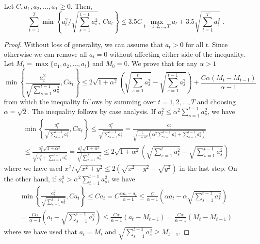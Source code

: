 \begin{lemma}
\label{lemma:useful}
Let $C, a_1, a_2, \dots, a_T\geq0$. Then,
$$
\sum_{t=1}^T \min \left\{ a_t^2 / \sqrt{\sum_{s=1}^{t-1} a_s^2}, \ C a_t \right\}
\le 3.5 C \max_{t=1,2,\dots,T} a_t + 3.5 \sqrt{\sum_{t=1}^T a_t^2} \; .
$$
\end{lemma}
\begin{proof}
Without loss of generality, we can assume that $a_t > 0$ for all $t$. Since otherwise we
can remove all $a_t = 0$ without affecting either side of the inequality. Let $M_t = \max\{a_1, a_2, \dots, a_t\}$ and $M_0 = 0$.
We prove that for any $\alpha > 1$
$$
\min\left\{ \frac{a_t^2}{\sqrt{\sum_{s=1}^{t-1} a_s^2}}, C a_t \right\}
\le 2 \sqrt{1+\alpha^2} \left( \sqrt{\sum_{s=1}^t a_s^2} - \sqrt{\sum_{s=1}^{t-1} a_s^2} \right) + \frac{C\alpha( M_t  - M_{t-1})}{\alpha - 1}
$$
from which the inequality follows by summing over $t=1,2,\dots,T$ and choosing $\alpha = \sqrt{2}$.
The inequality follows by case analysis. If $a_t^2 \le \alpha^2 \sum_{s=1}^{t-1} a_s^2$, we have
\begin{multline*}
\min\left\{ \frac{a_t^2}{\sqrt{\sum_{s=1}^{t-1} a_s^2}}, C a_t \right\}
\le \frac{a_t^2}{\sqrt{\sum_{s=1}^{t-1} a_s^2}}
= \frac{a_t^2}{\sqrt{\frac{1}{1+\alpha^2} \left( \alpha^2 \sum_{s=1}^{t-1} a_s^2 + \sum_{s=1}^{t-1} a_s^2 \right)}} \\
\le \frac{a_t^2\sqrt{1+\alpha^2}}{\sqrt{ a_t^2 + \sum_{s=1}^{t-1} a_s^2 }}
= \frac{a_t^2\sqrt{1+\alpha^2}}{\sqrt{\sum_{s=1}^t a_s^2}}
\le 2\sqrt{1+\alpha^2} \left( \sqrt{\sum_{s=1}^t a_s^2} - \sqrt{\sum_{s=1}^{t-1} a_s^2} \right)
\end{multline*}
where we have used $x^2/\sqrt{x^2+y^2} \le 2(\sqrt{x^2+y^2} - \sqrt{y^2})$ in the last step.
On the other hand, if $a_t^2 > \alpha^2 \sum_{t=1}^{t-1} a_s^2$, we have
\begin{multline*}
\min\left\{ \frac{a_t^2}{\sqrt{\sum_{s=1}^{t-1} a_s^2}}, C a_t \right\}
\le C a_t
= C \frac{\alpha a_t  - a_t}{\alpha - 1}
\le \frac{C}{\alpha - 1} \left( \alpha a_t  - \alpha \sqrt{\sum_{s=1}^{t-1} a_s^2} \right) \\
= \frac{C\alpha}{\alpha - 1} \left( a_t  - \sqrt{\sum_{s=1}^{t-1} a_s^2} \right)
\le \frac{C\alpha}{\alpha - 1} \left( a_t  - M_{t-1} \right)
= \frac{C\alpha}{\alpha - 1} \left( M_t  - M_{t-1} \right)
\end{multline*}
where we have used that $a_t = M_t$ and $\sqrt{\sum_{s=1}^{t-1} a_s^2} \ge M_{t-1}$.
\end{proof}

